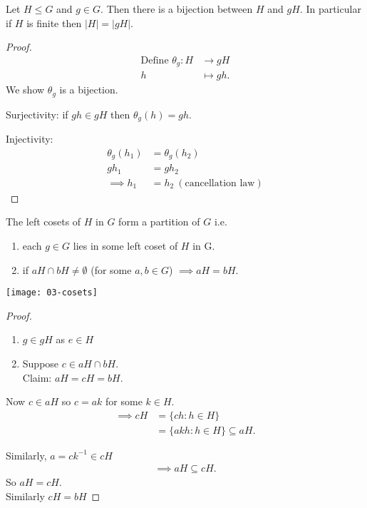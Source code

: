 \begin{lemma}
\protect\hypertarget{lem:nine}{}\label{lem:nine}Let $H \leq G$ and $g \in G$.
Then there is a bijection between $H$ and $gH$.
In particular if $H$ is finite then $|H| = |gH|$.
\end{lemma}

\begin{proof}
\begin{align*}
    \text{Define } \theta_g : H &\to gH \\
    h &\mapsto gh.
\end{align*}
We show $\theta_g$ is a bijection.

Surjectivity: if $gh \in gH$ then $\theta_g(h) = gh$.

Injectivity: \begin{align*}
    \theta_g(h_1) &= \theta_g(h_2) \\
    g h_1 &= g h_2 \\
    \implies h_1 &= h_2 \ (\text{cancellation law})
\end{align*}
\end{proof}

\begin{lemma}
\protect\hypertarget{lem:ten}{}\label{lem:ten}

    The left cosets of $H$ in $G$ form a partition of $G$ i.e.

    \begin{enumerate}
    \def\labelenumi{\roman{enumi}.}
    \item
    each $g \in G$ lies in some left coset of $H$ in G.
    \item
    if $aH \cap bH \neq \emptyset$ (for some $a, b \in G$) $\implies aH = bH$.
    \end{enumerate}

    {\centering \texttt{[image: 03-cosets]} }
\end{lemma}

\begin{proof} ~
    \begin{enumerate}
    \def\labelenumi{\roman{enumi}.}
        \item
        $g \in gH$ as $e \in H$
        \item
        Suppose $c \in aH \cap bH$.\\
        Claim: $aH = cH = bH$.
    \end{enumerate}

    Now $c \in aH$ so $c = ak$ for some $k \in H$.
    \begin{align*}
        \implies cH &= \{ c h : h \in H \} \\
        &= \{ a k h : h \in H \} \subseteq aH.
    \end{align*}

    Similarly, $a = c k^{-1} \in cH$
    \begin{align*}
        \implies aH \subseteq cH.
    \end{align*}
    So $aH = cH$.\\
    Similarly $cH = bH$
\end{proof}

